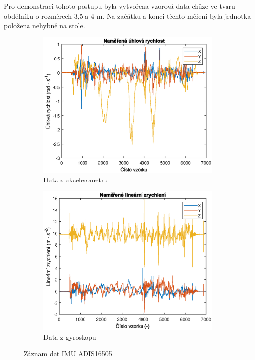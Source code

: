 Pro demonstraci tohoto postupu byla vytvořena vzorová data chůze ve tvaru obdélníku o rozměrech 3,5 a 4 m. Na začátku a konci těchto měření byla jednotka položena nehybně na stole.

\begin{figure}[h]
     \centering
     \begin{subfigure}[b]{0.49\textwidth}
         \centering
         \includegraphics[width=\textwidth]{obrazky/matlab/1measAngularVel}
         \caption{Data z akcelerometru}     
     \end{subfigure}
     \hfill
     \centering
     \begin{subfigure}[b]{0.49\textwidth}
         \centering
         \includegraphics[width=\textwidth]{obrazky/matlab/1measAccel}
         \caption{Data z gyroskopu}   
     \end{subfigure}

        \caption{Záznam dat IMU ADIS16505}
        \label{fig:IMURawData}
\end{figure}

